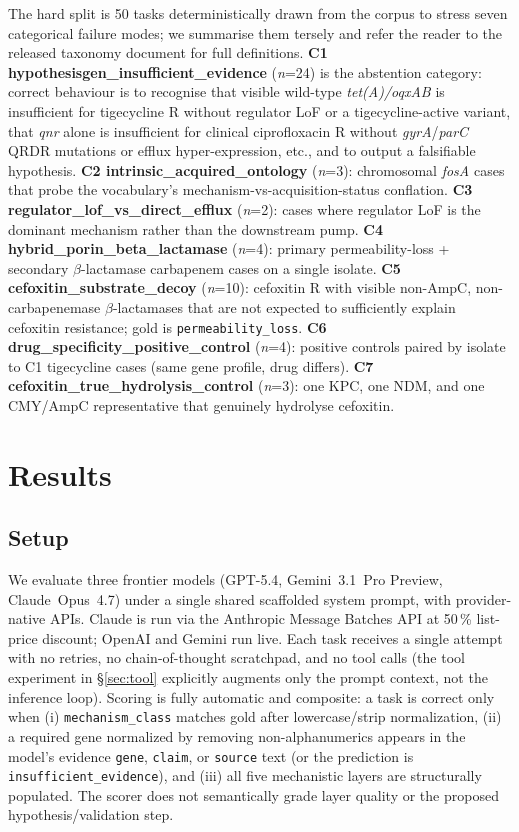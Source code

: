 \documentclass{article}
\begin{document}
The hard split is 50 tasks deterministically drawn from the corpus to stress
seven categorical failure modes; we summarise them tersely and refer the
reader to the released taxonomy document for full definitions.
\textbf{C1 hypothesisgen\_insufficient\_evidence} (\textit{n}=24) is the
abstention category: correct behaviour is to recognise that visible
wild-type \emph{tet(A)/oqxAB} is insufficient for tigecycline R without
regulator LoF or a tigecycline-active variant, that \emph{qnr} alone is
insufficient for clinical ciprofloxacin R without \emph{gyrA}/\emph{parC}
QRDR mutations or efflux hyper-expression, etc., and to output a
falsifiable hypothesis. \textbf{C2 intrinsic\_acquired\_ontology}
(\textit{n}=3): chromosomal \emph{fosA} cases that probe the vocabulary's
mechanism-vs-acquisition-status conflation. \textbf{C3
regulator\_lof\_vs\_direct\_efflux} (\textit{n}=2): cases where regulator
LoF is the dominant mechanism rather than the downstream pump.
\textbf{C4 hybrid\_porin\_beta\_lactamase} (\textit{n}=4): primary
permeability-loss + secondary $\beta$-lactamase carbapenem cases on a
single isolate. \textbf{C5 cefoxitin\_substrate\_decoy} (\textit{n}=10):
cefoxitin R with visible non-AmpC, non-carbapenemase $\beta$-lactamases
that are not expected to sufficiently explain cefoxitin resistance; gold is
\texttt{permeability\_loss}.
\textbf{C6 drug\_specificity\_positive\_control} (\textit{n}=4): positive
controls paired by isolate to C1 tigecycline cases (same gene profile,
drug differs). \textbf{C7 cefoxitin\_true\_hydrolysis\_control}
(\textit{n}=3): one KPC, one NDM, and one CMY/AmpC representative that
genuinely hydrolyse cefoxitin.

\section{Results}
\label{sec:results}

\subsection{Setup}

We evaluate three frontier models (GPT-5.4, Gemini~3.1~Pro Preview,
Claude~Opus~4.7) under a single shared scaffolded system prompt, with
provider-native APIs. Claude is run via the Anthropic Message Batches API at
50\,\% list-price discount; OpenAI and Gemini run live. Each task receives a
single attempt with no retries, no chain-of-thought scratchpad, and no tool
calls (the tool experiment in \S\ref{sec:tool} explicitly augments only the
prompt context, not the inference loop). Scoring is fully automatic and
composite: a task is correct only when (i) \texttt{mechanism\_class}
matches gold after lowercase/strip normalization, (ii) a required gene
normalized by removing non-alphanumerics appears in the model's evidence
\texttt{gene}, \texttt{claim}, or \texttt{source} text (or the prediction
is \texttt{insufficient\_evidence}), and (iii) all five mechanistic layers
are structurally populated. The scorer does not semantically grade layer
quality or the proposed hypothesis/validation step.
\end{document}
